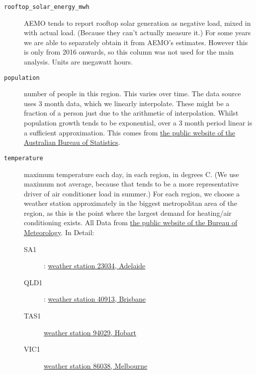 \begin{description}
    \item[\texttt{rooftop\_solar\_energy\_mwh}] AEMO tends to report rooftop solar generation as negative load, mixed in with actual load. (Because they can't actually measure it.) For some years we are able to separately obtain it from \ac{AEMO}'s estimates.  However this is only from 2016 onwards, so this column was not used for the main analysis. Units are megawatt hours.
    \item[\texttt{population}] number of people in this region. This varies over time. The data source uses 3 month data, which we linearly interpolate. These might be a fraction of a person just due to the arithmetic of interpolation. Whilst population growth tends to be exponential, over a 3 month period linear is a sufficient approximation.  This comes from \href{https://www.abs.gov.au/statistics/people/population/national-state-and-territory-population/jun-2023/310104.xlsx}{the public website of the Australian Bureau of Statistics}.
    \item[\texttt{temperature}] maximum temperature each day, in each region, in degrees C. (We use maximum not average, because that tends to be a more representative driver of air conditioner load in summer.) For each region, we choose a weather station approximately in the biggest metropolitan area of the region, as this is the point where the largest demand for heating/air conditioning exists. All Data from \href{https://reg.bom.gov.au/climate/data/}{the public website of the Bureau of Meteorology}.  In Detail:
    \begin{description}
        \item[SA1]: \href{https://reg.bom.gov.au/jsp/ncc/cdio/weatherData/av?p_nccObsCode=122&p_display_type=dailyDataFile&p_startYear=&p_c=&p_stn_num=23034}{weather station 23034, Adelaide}
        \item[QLD1]: \href{https://reg.bom.gov.au/jsp/ncc/cdio/weatherData/av?p_nccObsCode=122&p_display_type=dailyDataFile&p_startYear=&p_c=&p_stn_num=40913}{weather station 40913, Brisbane}
        \item[TAS1] \href{https://reg.bom.gov.au/jsp/ncc/cdio/weatherData/av?p_nccObsCode=122&p_display_type=dailyDataFile&p_startYear=&p_c=&p_stn_num=94029}{weather station 94029, Hobart}
        \item[VIC1] \href{https://reg.bom.gov.au/jsp/ncc/cdio/weatherData/av?p_nccObsCode=122&p_display_type=dailyDataFile&p_startYear=&p_c=&p_stn_num=86038}{weather station 86038, Melbourne}

\end{description}
\end{description}
